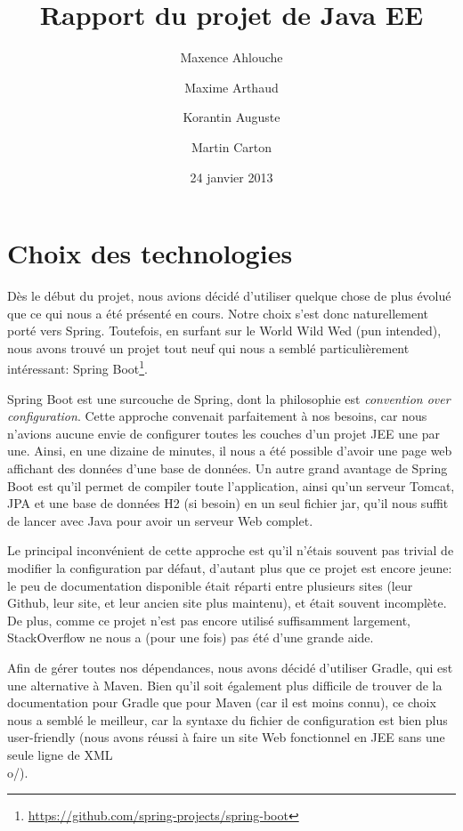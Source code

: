 \documentclass[10pt]{scrartcl}
\begin{document}
\title{Rapport du projet de Java EE}
\author{Maxence Ahlouche \and Maxime Arthaud \and Korantin Auguste \and Martin Carton}

\date{24 janvier 2013}
\maketitle

\section{Choix des technologies}
  Dès le début du projet, nous avions décidé d'utiliser quelque chose
  de plus évolué que ce qui nous a été présenté en cours. Notre choix
  s'est donc naturellement porté vers Spring. Toutefois, en surfant
  sur le World Wild Wed (pun intended), nous avons trouvé un projet
  tout neuf qui nous a semblé particulièrement intéressant: Spring
  Boot\footnote{\url{https://github.com/spring-projects/spring-boot}}.

    Spring Boot est une surcouche de Spring, dont la philosophie est
    \emph{convention over configuration}. Cette approche convenait
    parfaitement à nos besoins, car nous n'avions aucune envie de
    configurer toutes les couches d'un projet JEE une par une. Ainsi,
    en une dizaine de minutes, il nous a été possible d'avoir une page
    web affichant des données d'une base de données. Un autre grand
    avantage de Spring Boot est qu'il permet de compiler toute
    l'application, ainsi qu'un serveur Tomcat, JPA et une base de
    données H2 (si besoin) en un seul fichier jar, qu'il nous suffit
    de lancer avec Java pour avoir un serveur Web complet.

    Le principal inconvénient de cette approche est qu'il n'étais
    souvent pas trivial de modifier la configuration par défaut,
    d'autant plus que ce projet est encore jeune: le peu de
    documentation disponible était réparti entre plusieurs sites (leur
    Github, leur site, et leur ancien site plus maintenu), et était
    souvent incomplète. De plus, comme ce projet n'est pas encore
    utilisé suffisamment largement, StackOverflow ne nous a (pour une
    fois) pas été d'une grande aide.

    Afin de gérer toutes nos dépendances, nous avons décidé d'utiliser
    Gradle, qui est une alternative à Maven. Bien qu'il soit également
    plus difficile de trouver de la documentation pour Gradle que pour
    Maven (car il est moins connu), ce choix nous a semblé le
    meilleur, car la syntaxe du fichier de configuration est bien plus
    user-friendly (nous avons réussi à faire un site Web fonctionnel
    en JEE sans une seule ligne de XML \\o/).
\end{document}
